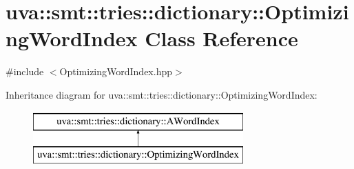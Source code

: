 \hypertarget{classuva_1_1smt_1_1tries_1_1dictionary_1_1_optimizing_word_index}{}\section{uva\+:\+:smt\+:\+:tries\+:\+:dictionary\+:\+:Optimizing\+Word\+Index Class Reference}
\label{classuva_1_1smt_1_1tries_1_1dictionary_1_1_optimizing_word_index}


{\ttfamily \#include $<$Optimizing\+Word\+Index.\+hpp$>$}

Inheritance diagram for uva\+:\+:smt\+:\+:tries\+:\+:dictionary\+:\+:Optimizing\+Word\+Index\+:\begin{figure}[H]
\begin{center}
\leavevmode
\includegraphics[height=2.000000cm]{classuva_1_1smt_1_1tries_1_1dictionary_1_1_optimizing_word_index}
\end{center}
\end{figure}
